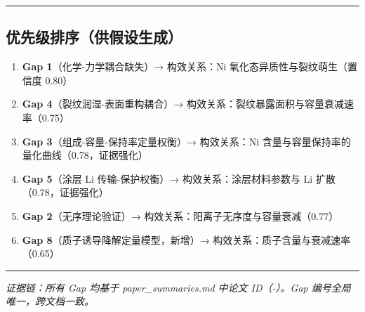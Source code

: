 \documentclass[12pt,a4paper]{ctexart}
\providecommand{\tightlist}{%
  \setlength{\itemsep}{0pt}\setlength{\parskip}{0pt}}
\begin{document}
\begin{center}\rule{0.5\linewidth}{0.5pt}\end{center}

\subsection{优先级排序（供假设生成）}\label{gap:ux4f18ux5148ux7ea7ux6392ux5e8fux4f9bux5047ux8bbeux751fux6210}

\begin{enumerate}
\def\labelenumi{\arabic{enumi}.}
\tightlist
\item
  \textbf{Gap 1}（化学-力学耦合缺失）→ 构效关系：Ni 氧化态异质性与裂纹萌生（置信度 0.80）
\item
  \textbf{Gap 4}（裂纹润湿-表面重构耦合）→ 构效关系：裂纹暴露面积与容量衰减速率（0.75）
\item
  \textbf{Gap 3}（组成-容量-保持率定量权衡）→ 构效关系：Ni 含量与容量保持率的量化曲线（0.78，证据强化）
\item
  \textbf{Gap 5}（涂层 Li 传输-保护权衡）→ 构效关系：涂层材料参数与 Li 扩散（0.78，证据强化）
\item
  \textbf{Gap 2}（无序理论验证）→ 构效关系：阳离子无序度与容量衰减（0.77）
\item
  \textbf{Gap 8}（质子诱导降解定量模型，新增）→ 构效关系：质子含量与衰减速率（0.65）
\end{enumerate}

\begin{center}\rule{0.5\linewidth}{0.5pt}\end{center}

\emph{证据链：所有 Gap 均基于 paper\_summaries.md 中论文 ID（\cite{p06}-\cite{p50}）。Gap 编号全局唯一，跨文档一致。}

\printbibliography[title=参考文献]
\end{document}
